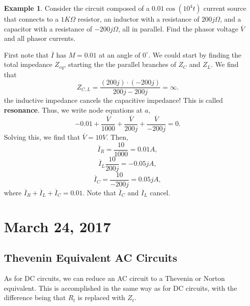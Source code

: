 \documentclass[11pt]{article}
\theoremstyle{plain} %
\theoremstyle{definition}
\theoremstyle{example}
\newtheorem*{example}{Example}
\theoremstyle{remark}
\newcommand{\degree}{^{\circ}}
\begin{document}
\begin{example}
Consider the circuit composed of a $0.01\cos\left(10^4t\right)$ current source that connects to a $1K\Omega$ resistor, an inductor with a resistance of $200j\Omega$, and a capacitor with a resistance of $-200j\Omega$, all in parallel. Find the phasor voltage $\overline V$ and all phasor currents. 
\end{example}
First note that $\overline I$ has $M = 0.01$ at an angle of $0\degree$. We could start by finding the total impedance $Z_{eq}$, starting the the parallel branches of $Z_C$ and $Z_L$. We find that 
$$Z_{C,L} = \frac{(200j) \cdot (-200j)}{200j - 200j} = \infty.$$
the inductive impedance cancels the capacitive impedance! This is called \textbf{resonance}. 
Thus, we write node equations at $a$,
$$-0.01+\frac{\overline V}{1000} + \frac{\overline V}{200j} + \frac{\overline V}{-200j} = 0.$$
Solving this, we find that $\overline V = 10V$. 
Then, 
$$\overline I_R = \frac{10}{1000} = 0.01A,$$
$$\overline I_L \frac{10}{200j} =-0.05jA,$$
$$\overline I_C = \frac{10}{-200j} = 0.05jA,$$
where $\overline I_R + \overline I_L + \overline I_C = 0.01$. 
Note that $\overline I_C$ and $\overline I_L$ cancel. 

\section{March 24, 2017}
\subsection{Thevenin Equivalent AC Circuits}
As for DC circuits, we can reduce an AC circuit to a Thevenin or Norton equivalent. This is accomplished in the same way as for DC circuits, with the difference being that $R_t$ is replaced with $Z_t$. 
\end{document}
